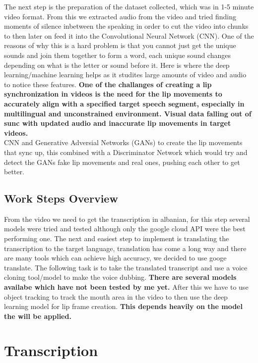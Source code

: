 \documentclass[12pt]{article}
\begin{document}
The next step is the preparation of the dataset collected, which was in 1-5 minute video format. From this we extracted audio from the video and tried finding moments of silence inbetween the speaking in order to cut the video into chunks to then later on feed it into the Convolutional Neural Network (CNN).
One of the reasons of why this is a hard problem is that you cannot just get the unique sounds and join them together to form a word, each unique sound changes depending on what is the letter or sound before it. Here is where the deep learning/machine learning helps as it studites large amounts of video and audio to notice these features.
\textbf{One of the challanges of creating a lip synchronization in videos is the need for the lip movements to accurately align with a specified target speech segment, especially in multilingual and unconstrained environment. Visual data falling out of sunc with updated audio and inaccurate lip movements in target videos.}\\
CNN and Generative Adversial Networks (GANs) to create the lip movements that sync up, this combined with a Discriminator Network which would try and detect the GANs fake lip movements and real ones, pushing each other to get better.

\subsection{Work Steps Overview}

From the video we need to get the transcription in albanian, for this step several models were tried and tested although only the google cloud API were the best performing one. The next and easiest step to implement is translating the transcription to the target language, translation has come a long way and there are many tools which can achieve high accuracy, we decided to use googe translate. The following task is to take the translated transcript and use a voice cloning tool/model to make the voice dubbing. \textbf{There are several models availabe which have not been tested by me yet.} After this we have to use object tracking to track the mouth area in the video to then use the deep learning model for lip frame creation. \textbf{This depends heavily on the model the will be applied.}

\section{Transcription}
\end{document}
